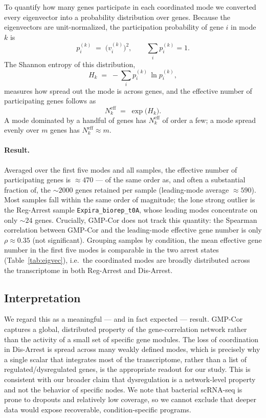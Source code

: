To quantify how many genes participate in each coordinated mode we converted every
eigenvector into a probability distribution over genes.
Because the eigenvectors are unit-normalized, the participation probability of gene $i$
in mode $k$ is
\begin{equation}
  p_i^{(k)} \;=\; \bigl(v_i^{(k)}\bigr)^{2},
  \qquad \sum_{i} p_i^{(k)} = 1 .
\end{equation}
The Shannon entropy of this distribution,
\begin{equation}
  H_k \;=\; -\sum_{i} p_i^{(k)} \, \ln p_i^{(k)},
\end{equation}
measures how spread out the mode is across genes, and the effective number of
participating genes follows as
\begin{equation}
  N^{\mathrm{eff}}_k \;=\; \exp\!\bigl(H_k\bigr).
\end{equation}
A mode dominated by a handful of genes has $N^{\mathrm{eff}}_k$ of order a few;
a mode spread evenly over $m$ genes has $N^{\mathrm{eff}}_k \approx m$.

\paragraph{Result.}
Averaged over the first five modes and all samples, the effective number of
participating genes is $\approx 470$ --- of the same order as, and often a substantial
fraction of, the $\sim\!2000$ genes retained per sample (leading-mode average
$\approx 590$).
Most samples fall within the same order of magnitude; the lone strong outlier is the
Reg-Arrest sample \texttt{Expira\_biorep\_t0A}, whose leading modes concentrate on only
$\sim\!24$ genes.
Crucially, GMP-Cor does not track this quantity: the Spearman correlation between
GMP-Cor and the leading-mode effective gene number is only $\rho \approx 0.35$
(not significant).
Grouping samples by condition, the mean effective gene number in the first five modes
is comparable in the two arrest states (Table~\ref{tab:eigvec}), i.e.\ the coordinated
modes are broadly distributed across the transcriptome in both Reg-Arrest and Dis-Arrest.

\subsection*{Interpretation}

We regard this as a meaningful --- and in fact expected --- result.
GMP-Cor captures a global, distributed property of the gene-correlation network rather
than the activity of a small set of specific gene modules.
The loss of coordination in Dis-Arrest is spread across many weakly defined modes, which
is precisely why a single scalar that integrates most of the transcriptome, rather than
a list of regulated/dysregulated genes, is the appropriate readout for our study.
This is consistent with our broader claim that dysregulation is a network-level property
and not the behavior of specific nodes.
We note that bacterial scRNA-seq is prone to dropouts and relatively low coverage, so we
cannot exclude that deeper data would expose recoverable, condition-specific programs.

